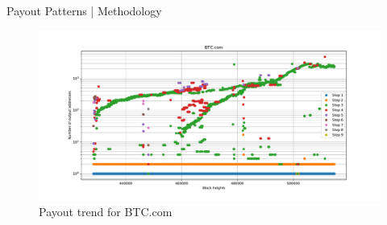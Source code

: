 \documentclass[10pt]{beamer}
\begin{document}
\begin{frame}[fragile]{Payout Patterns | Methodology}
    \begin{figure}
        \includegraphics[width=\textwidth]{images/payout_trend_BTC_com.pdf}
        \caption{Payout trend for BTC.com} \label{fig:payout_trend_BTCcom}
    \end{figure}
\end{frame}


\end{document}
